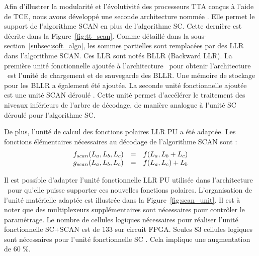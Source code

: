 Afin d'illustrer la modularité et l'évolutivité des processeurs TTA conçus à l'aide de TCE, nous avons développé une seconde architecture nommée \TTSCAN. Elle permet le support de l'algorithme SCAN en plus de l'algorithme SC. Cette dernière est décrite dans la Figure~\ref{fig:tt_scan}.
Comme détaillé dans la sous-section~\ref{subsec:soft_algo}, les sommes partielles sont remplacées par des LLR dans l'algorithme SCAN. Ces LLR sont notés BLLR (Backward LLR). La première unité fonctionnelle ajoutée à l'architecture \TTSC~pour obtenir l'architecture \TTSCAN~est l'unité de chargement et de sauvegarde des BLLR. Une mémoire de stockage pour les BLLR a également été ajoutée. La seconde unité fonctionnelle ajoutée est une unité \og SCAN déroulé \fg. Cette unité permet d'accélérer le traitement des niveaux inférieurs de l'arbre de décodage, de manière analogue à l'unité \og SC déroulé \fg pour l'algorithme SC.

De plus, l'unité de calcul des fonctions polaires LLR PU a été adaptée. Les fonctions élémentaires nécessaires au décodage de l'algorithme SCAN sont : 
\begin{eqnarray}
  \begin{array}{l c l}
    f_{scan}(L_a,L_b,L_c) & = & f(L_a, L_b  + L_c) \\
    g_{scan}(L_a,L_b,L_c) & = & f(L_a, L_c) + L_b
  \end{array}
  \label{eq:bp}
\end{eqnarray}


Il est possible d'adapter l'unité fonctionnelle LLR PU utilisée dans l'architecture \TTSC~pour qu'elle puisse supporter ces nouvelles fonctions polaires. L'organisation de l'unité matérielle adaptée est illustrée dans la Figure~\ref{fig:scan_unit}. Il est à noter que des multiplexeurs supplémentaires sont nécessaires pour contrôler le paramétrage. Le nombre de cellules logiques nécessaires pour réaliser l'unité fonctionnelle \og SC+SCAN \fg est de 133 sur circuit FPGA. Seules 83 cellules logiques sont nécessaires pour l'unité fonctionnelle \og SC \fg. Cela implique une augmentation de 60 \%.



